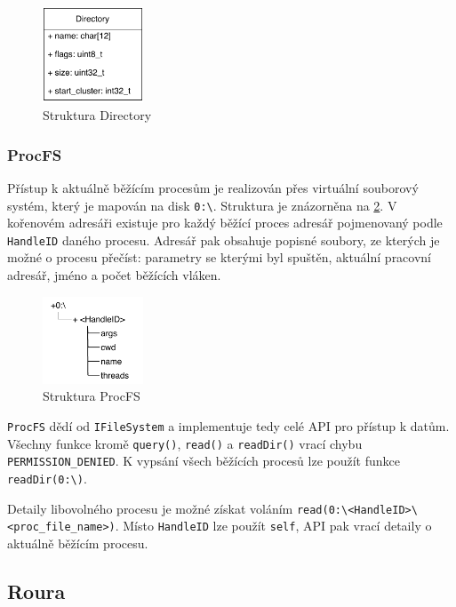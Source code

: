 \documentclass[11pt,a4paper]{scrartcl}
\begin{document}
	\begin{figure}[H]
		\centering
		\includegraphics[width=3cm]{dir-c.pdf}
		\caption{Struktura Directory}
		\label{fig:dir-c}
	\end{figure}


	\subsubsection{ProcFS}
	Přístup k aktuálně běžícím procesům je realizován přes virtuální souborový systém, který je mapován na disk \verb|0:\|. Struktura je znázorněna na \ref{fig:procfs-struct}. V kořenovém adresáři existuje pro každý běžící proces adresář pojmenovaný podle \verb|HandleID| daného procesu. Adresář pak obsahuje popisné soubory, ze kterých je možné o procesu přečíst: parametry se kterými byl spuštěn, aktuální pracovní adresář, jméno a počet běžících vláken.
	
	\begin{figure}[H]
		\centering
		\includegraphics[width=3cm]{procfs-struct.pdf}
		\caption{Struktura ProcFS}
		\label{fig:procfs-struct}
	\end{figure}
	
	\verb|ProcFS| dědí od \verb|IFileSystem| a implementuje tedy celé API pro přístup k datům. Všechny funkce kromě \verb|query()|, \verb|read()| a \verb|readDir()| vrací chybu \verb|PERMISSION_DENIED|. K vypsání všech běžících procesů lze použít funkce \verb|readDir(0:\)|.
	
	Detaily libovolného procesu je možné získat voláním \verb|read(0:\<HandleID>\<proc_file_name>)|. Místo \verb|HandleID| lze použít \verb|self|, API pak vrací detaily o aktuálně běžícím procesu.

	
	\subsection{Roura}
	
\end{document}
